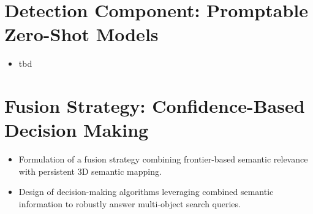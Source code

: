 \section{Detection Component: Promptable Zero-Shot Models}
\begin{itemize}
    \item tbd
\end{itemize}

\section{Fusion Strategy: Confidence-Based Decision Making}
\begin{itemize}
    \item Formulation of a fusion strategy combining frontier-based semantic relevance with persistent 3D semantic mapping.
    \item Design of decision-making algorithms leveraging combined semantic information to robustly answer multi-object search queries.
\end{itemize}
